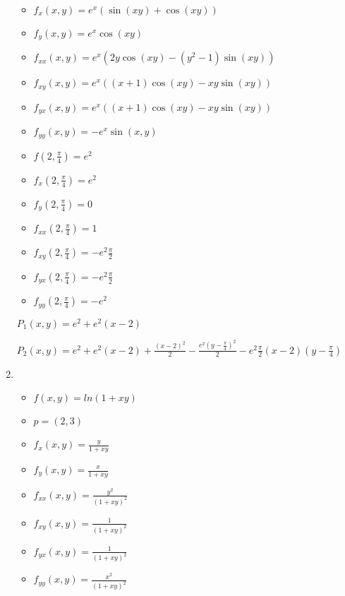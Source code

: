 \documentclass[../practica_05.tex]{subfiles}
\begin{document}
\begin{enumerate}
            \begin{itemize}
                \item $f_{x}(x,y) = e^x(\sin(xy)+\cos(xy)) $
                \item $f_{y}(x,y) = e^x\cos(xy) $
                \item $f_{xx}(x,y) = e^x(2y\cos(xy)-(y^2-1)\sin(xy)) $
                \item $f_{xy}(x,y) = e^x((x+1)\cos(xy)-xy\sin(xy)) $
                \item $f_{yx}(x,y) = e^x((x+1)\cos(xy)-xy\sin(xy)) $
                \item $f_{yy}(x,y) = -e^x\sin(x,y) $
            \end{itemize}

            \begin{itemize}
                \item $f(2,\frac{\pi}{4}) = e^2 $
                \item $f_{x}(2,\frac{\pi}{4}) = e^2 $
                \item $f_{y}(2,\frac{\pi}{4}) = 0 $
                \item $f_{xx}(2,\frac{\pi}{4}) = 1 $
                \item $f_{xy}(2,\frac{\pi}{4}) = -e^2\frac{\pi}{2} $
                \item $f_{yx}(2,\frac{\pi}{4}) = -e^2\frac{\pi}{2} $
                \item $f_{yy}(2,\frac{\pi}{4}) = -e^2 $
            \end{itemize}

            $P_1(x,y) = e^2 + e^2(x-2)$

            $P_2(x,y) = e^2 + e^2(x-2) + \frac{(x-2)^2}{2} - \frac{e^2(y-\frac{\pi}{4})^2}{2} - e^2\frac{\pi}{2}(x-2)(y-\frac{\pi}{4}) $

        \item 
            \begin{itemize}
                \item $f(x,y) = ln(1+xy)$
                \item $p = (2,3)$
            \end{itemize}

            \begin{itemize}
                \item $f_{x}(x,y) = \frac{y}{1+xy}$
                \item $f_{y}(x,y) = \frac{x}{1+xy} $
                \item $f_{xx}(x,y) = \frac{y^2}{(1+xy)^2} $
                \item $f_{xy}(x,y) = \frac{1}{(1+xy)^2} $
                \item $f_{yx}(x,y) = \frac{1}{(1+xy)^2} $
                \item $f_{yy}(x,y) = \frac{x^2}{(1+xy)^2} $
            \end{itemize}


\end{enumerate}
\end{document}
